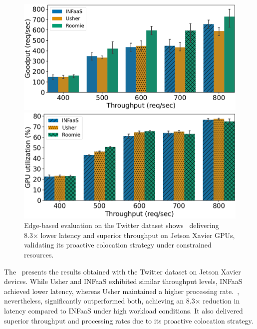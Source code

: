 \begin{figure}
\begin{minipage}[t]{.24\linewidth}
		\centering
		\includegraphics[width=\linewidth]{chapters/roomie/images/JetsonNano/twitter-all-models/goodput.pdf}
	\end{minipage}
	\hfill
	\begin{minipage}[t]{.24\linewidth}
		\centering
		\includegraphics[width=\linewidth]{chapters/roomie/images/JetsonNano/twitter-all-models/gpu_utilization.png}
	\end{minipage}
	\caption{Edge-based evaluation on the Twitter dataset shows~\roomie{} delivering 8.3× lower latency and superior throughput on Jetson Xavier GPUs, validating its proactive colocation strategy under constrained resources.}
	\label{fig:JetsonNano/twitter-all-models}
	\vspace{-3mm}
\end{figure}

The~ presents the results obtained with the Twitter dataset on Jetson Xavier devices. While Usher and INFaaS exhibited similar throughput levels, INFaaS achieved lower latency, whereas Usher maintained a higher processing rate.~\roomie, nevertheless, significantly outperformed both, achieving an 8.3× reduction in latency compared to INFaaS under high workload conditions. It also delivered superior throughput and processing rates due to its proactive colocation strategy.

